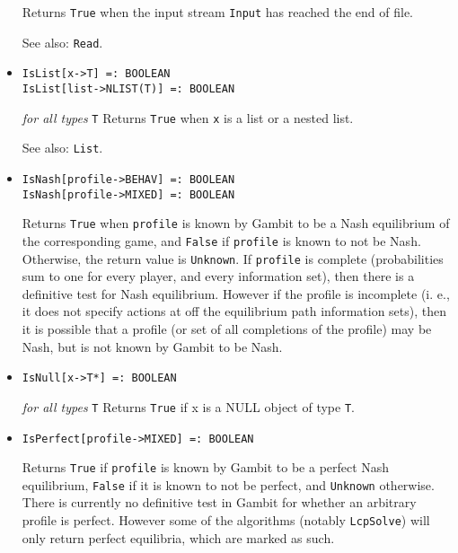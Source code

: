 \begin{itemize}
\bd
Returns \verb+True+ when the input stream \verb+Input+ has reached the
end of file.
\item [See also:] \verb+Read+.
\ed

\item{}
\protect \large \begin{verbatim}
IsList[x->T] =: BOOLEAN 
IsList[list->NLIST(T)] =: BOOLEAN 
\end{verbatim}\normalsize

{\it for all types} {\tt T}
\bd 
Returns \verb+True+ when \verb+x+ is a list or a nested list.
\item
[See also:] \verb+List+.
\ed

\item{}
\protect \large \begin{verbatim}
IsNash[profile->BEHAV] =: BOOLEAN 
IsNash[profile->MIXED] =: BOOLEAN 
\end{verbatim}\normalsize

\bd
Returns \verb+True+ when \verb+profile+ is known by Gambit to be a
Nash equilibrium of the corresponding game, and \verb+False+ if
\verb+profile+ is known to not be Nash.  Otherwise, the return value
is \verb+Unknown+.  If \verb+profile+ is complete (probabilities sum
to one for every player, and every information set), then there is a
definitive test for Nash equilibrium.  However if the profile is
incomplete (i. e., it does not specify actions at off the equilibrium
path information sets), then it is possible that a profile (or set of
all completions of the profile) may be Nash, but is not known by
Gambit to be Nash.
\ed

\item{}
\protect \large \begin{verbatim}
IsNull[x->T*] =: BOOLEAN 
\end{verbatim}\normalsize

{\it for all types} {\tt T}
\bd
Returns \verb+True+ if x is a NULL object of type \verb+T+.  
\ed

\item{}
\protect \large \begin{verbatim}
IsPerfect[profile->MIXED] =: BOOLEAN 
\end{verbatim}\normalsize

\bd 
Returns \verb+True+ if \verb+profile+ is known by Gambit to be a
perfect Nash equilibrium, \verb+False+ if it is known to not be
perfect, and \verb+Unknown+ otherwise.  There is currently no
definitive test in Gambit for whether an arbitrary profile is perfect.
However some of the algorithms (notably \verb+LcpSolve+) will only
return perfect equilibria, which are marked as such.   
\ed


\end{itemize}
